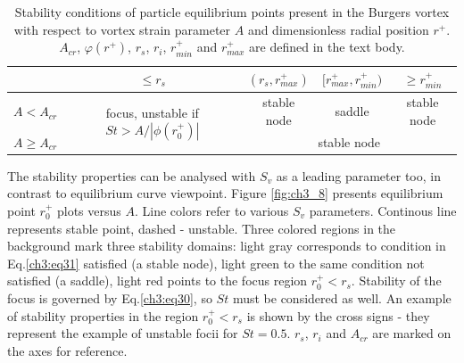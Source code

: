 \documentclass[../main.tex]{subfiles}
\begin{document}
\begin{table}
\small
\tabcolsep=0.2cm
\caption{Stability conditions of particle equilibrium points present in the Burgers vortex with respect to vortex strain parameter $A$ and dimensionless radial position $r^+$. $A_{cr}$, $\varphi(r^+)$, $r_s$, $r_i$, $r^+_{min}$ and $r^+_{max}$ are defined in the text body.}
\centering
\begin{tabular}{|l|c|c|c|c|}
\hline 
 & $ \leq r_s$ & $(r_s,r^+_{max})$ & $[r^+_{max}, r^+_{min})$ & $\geq r^+_{min}$ \\
\hline
$A < A_{cr}$ & \multirow{2}{*}{focus, unstable if $St>A/|\phi(r^+_0)|$} & stable node & saddle & stable node\\
\cline{3-5}
$A \geq A_{cr}$ &  \multirow{2}{*}{\ } & \multicolumn{3}{|c|}{stable node}\\
\hline
\end{tabular}
\label{tab:ch3_3}
\end{table}
 
The stability properties can be analysed with $S_v$ as a leading parameter too, in contrast to equilibrium curve viewpoint. Figure \ref{fig:ch3_8} presents equilibrium point $r^+_0$ plots versus $A$. Line colors refer to various $S_v$ parameters. Continous line represents stable point, dashed - unstable. Three colored regions in the background mark three stability domains: light gray corresponds to condition in Eq.\ref{ch3:eq31} satisfied (a stable node), light green to the same condition not satisfied (a saddle), light red points to the focus region $r^+_0<r_s$. Stability of the focus is governed by Eq.\ref{ch3:eq30}, so $St$ must be considered as well. An example of stability properties in the region $r^+_0<r_s$ is shown by the cross signs - they represent the example of unstable focii for $St=0.5$. $r_s$, $r_i$ and $A_{cr}$ are marked on the axes for reference.
\end{document}
